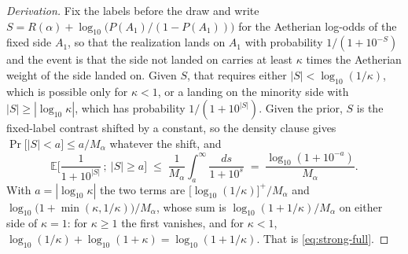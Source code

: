 \documentclass[11pt]{article}
\theoremstyle{definition}
\begin{document}
\begin{proof}[Derivation]
Fix the labels before the draw and write $S = R(\alpha) + \log_{10}\big(P(A_1)/(1 - P(A_1))\big)$ for the Aetherian log-odds of the fixed side $A_1$, so that the realization lands on $A_1$ with probability $1/(1 + 10^{-S})$ and the event is that the side not landed on carries at least $\kappa$ times the Aetherian weight of the side landed on. Given $S$, that requires either $|S| < \log_{10}(1/\kappa)$, which is possible only for $\kappa < 1$, or a landing on the minority side with $|S| \ge |\log_{10} \kappa|$, which has probability $1/(1 + 10^{|S|})$. Given the prior, $S$ is the fixed-label contrast shifted by a constant, so the density clause gives $\Pr\big[|S| < a\big] \le a/M_\alpha$ whatever the shift, and
\[
\mathbb{E}\Big[\frac{1}{1 + 10^{|S|}}\,;\ |S| \ge a\Big] \;\le\; \frac{1}{M_\alpha}\int_a^\infty \frac{ds}{1 + 10^{s}} \;=\; \frac{\log_{10}(1 + 10^{-a})}{M_\alpha}.
\]
With $a = |\log_{10}\kappa|$ the two terms are $\big[\log_{10}(1/\kappa)\big]^{+}/M_\alpha$ and $\log_{10}\big(1 + \min(\kappa, 1/\kappa)\big)/M_\alpha$, whose sum is $\log_{10}(1 + 1/\kappa)/M_\alpha$ on either side of $\kappa = 1$: for $\kappa \ge 1$ the first vanishes, and for $\kappa < 1$, $\log_{10}(1/\kappa) + \log_{10}(1 + \kappa) = \log_{10}(1 + 1/\kappa)$. That is \eqref{eq:strong-full}.
\end{proof}
\end{document}
